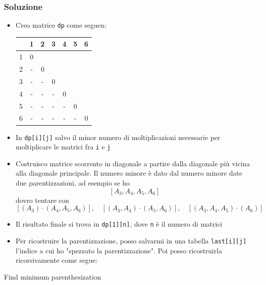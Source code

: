 \subsubsection{Soluzione}
\begin{itemize}
	\item Creo matrice \verb|dp| come seguen:
	      \begin{center}
		      \begin{tabular}{|c|c|c|c|c|c|c|}
			      \hline
			        & 1 & 2 & 3 & 4 & 5 & 6 \\
			      \hline
			      1 & 0 &   &   &   &   &   \\
			      \hline
			      2 & - & 0 &   &   &   &   \\
			      \hline
			      3 & - & - & 0 &   &   &   \\
			      \hline
			      4 & - & - & - & 0 &   &   \\
			      \hline
			      5 & - & - & - & - & 0 &   \\
			      \hline
			      6 & - & - & - & - & - & 0 \\
			      \hline
		      \end{tabular}
	      \end{center}
	\item In \verb|dp[i][j]| salvo il minor numero di moltiplicazioni necessarie per moltiplicare le matrici fra \verb|i|  e \verb|j|
	\item Costruisco matrice scorrento in diagonale a partire dalla diagonale più vicina alla diagonale principale. Il numero minore è dato dal numero minore date due parentizzazioni, ad esempio se ho
	      \[
		      \left[A_3,A_4,A_5, A_6\right]
	      \]
	      dovro tentare con
	      \[
		      \left[\left(A_3\right) \cdot  \left(A_4, A_5, A_6\right)\right], \quad \left[\left(A_3, A_4\right) \cdot  \left(A_5, A_6\right)\right], \quad \left[\left(A_3, A_4, A_5\right) \cdot  \left(A_6\right)\right]
	      \]
	\item Il risultato finale si trova in \verb|dp[1][n]|, dove \verb|n| è il numero di matrici
	\item Per ricostruire la parentizzazione, posso salvarmi in una tabella \verb|last[i][j]| l'indice a cui ho "spezzato la parentizzazione". Poi posso ricostruirla ricorsivamente come segue:
\end{itemize}

\begin{algoritmo}{Find minimum parenthesization}
	\begin{algorithm}[H]
		\caption{Print optimal parenthesization}
	\end{algorithm}
\end{algoritmo}
